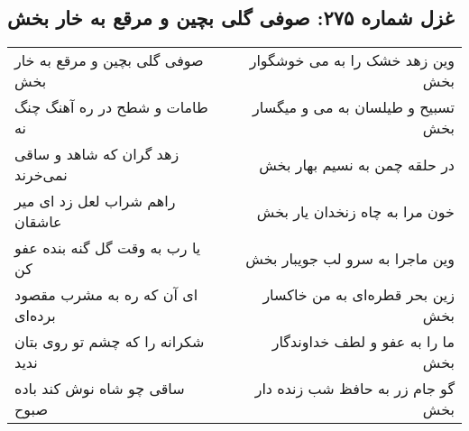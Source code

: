 \begin{center}
\section*{غزل شماره ۲۷۵: صوفی گلی بچین و مرقع به خار بخش}
\label{sec:sh275}
\begin{longtable}{l p{0.5cm} r}
صوفی گلی بچین و مرقع به خار بخش
&&
وین زهد خشک را به می خوشگوار بخش
\\
طامات و شطح در ره آهنگ چنگ نه
&&
تسبیح و طیلسان به می و میگسار بخش
\\
زهد گران که شاهد و ساقی نمی‌خرند
&&
در حلقه چمن به نسیم بهار بخش
\\
راهم شراب لعل زد ای میر عاشقان
&&
خون مرا به چاه زنخدان یار بخش
\\
یا رب به وقت گل گنه بنده عفو کن
&&
وین ماجرا به سرو لب جویبار بخش
\\
ای آن که ره به مشرب مقصود برده‌ای
&&
زین بحر قطره‌ای به من خاکسار بخش
\\
شکرانه را که چشم تو روی بتان ندید
&&
ما را به عفو و لطف خداوندگار بخش
\\
ساقی چو شاه نوش کند باده صبوح
&&
گو جام زر به حافظ شب زنده دار بخش
\\
\end{longtable}
\end{center}
